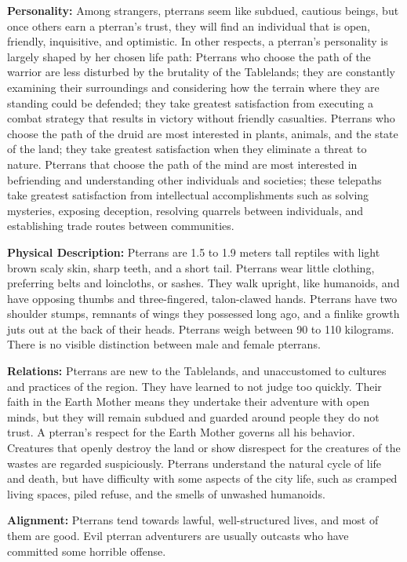 \textbf{Personality:} Among strangers, pterrans seem like subdued, cautious beings, but once others earn a pterran's trust, they will find an individual that is open, friendly, inquisitive, and optimistic. In other respects, a pterran's personality is largely shaped by her chosen life path: Pterrans who choose the path of the warrior are less disturbed by the brutality of the Tablelands; they are constantly examining their surroundings and considering how the terrain where they are standing could be defended; they take greatest satisfaction from executing a combat strategy that results in victory without friendly casualties. Pterrans who choose the path of the druid are most interested in plants, animals, and the state of the land; they take greatest satisfaction when they eliminate a threat to nature. Pterrans that choose the path of the mind are most interested in befriending and understanding other individuals and societies; these telepaths take greatest satisfaction from intellectual accomplishments such as solving mysteries, exposing deception, resolving quarrels between individuals, and establishing trade routes between communities.

\textbf{Physical Description:} Pterrans are 1.5 to 1.9 meters tall reptiles with light brown scaly skin, sharp teeth, and a short tail. Pterrans wear little clothing, preferring belts and loincloths, or sashes. They walk upright, like humanoids, and have opposing thumbs and three-fingered, talon-clawed hands. Pterrans have two shoulder stumps, remnants of wings they possessed long ago, and a finlike growth juts out at the back of their heads. Pterrans weigh between 90 to 110 kilograms. There is no visible distinction between male and female pterrans.

\textbf{Relations:} Pterrans are new to the Tablelands, and unaccustomed to cultures and practices of the region. They have learned to not judge too quickly. Their faith in the Earth Mother means they undertake their adventure with open minds, but they will remain subdued and guarded around people they do not trust. A pterran's respect for the Earth Mother governs all his behavior. Creatures that openly destroy the land or show disrespect for the creatures of the wastes are regarded suspiciously. Pterrans understand the natural cycle of life and death, but have difficulty with some aspects of the city life, such as cramped living spaces, piled refuse, and the smells of unwashed humanoids.

\textbf{Alignment:} Pterrans tend towards lawful, well-structured lives, and most of them are good. Evil pterran adventurers are usually outcasts who have committed some horrible offense.

